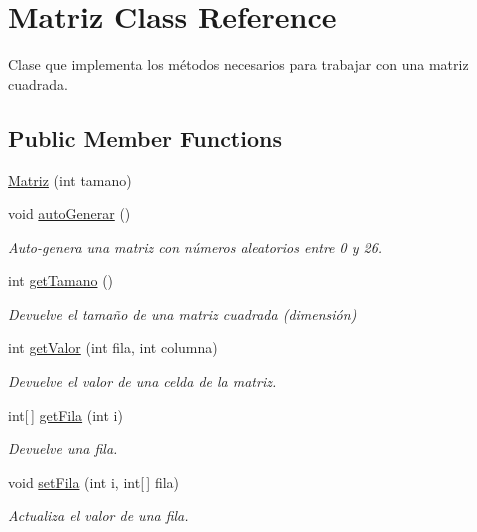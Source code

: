 \hypertarget{classMatriz}{\section{Matriz Class Reference}
\label{classMatriz}
}


Clase que implementa los métodos necesarios para trabajar con una matriz cuadrada.  


\subsection*{Public Member Functions}
\begin{DoxyCompactItemize}
\item 
\hyperlink{classMatriz_a5300a2e433d2a0ce0f7a18879591ba44}{Matriz} (int tamano)
\item 
void \hyperlink{classMatriz_a4951dffed918ec71ccfc4da71df8d155}{auto\-Generar} ()
\begin{DoxyCompactList}\small\item\em Auto-\/genera una matriz con números aleatorios entre 0 y 26. \end{DoxyCompactList}\item 
int \hyperlink{classMatriz_ac7480742c1df8a3b165e2bb55006310d}{get\-Tamano} ()
\begin{DoxyCompactList}\small\item\em Devuelve el tamaño de una matriz cuadrada (dimensión) \end{DoxyCompactList}\item 
int \hyperlink{classMatriz_aff57f6720c62264098b013f66960508f}{get\-Valor} (int fila, int columna)
\begin{DoxyCompactList}\small\item\em Devuelve el valor de una celda de la matriz. \end{DoxyCompactList}\item 
int\mbox{[}$\,$\mbox{]} \hyperlink{classMatriz_ac8e0eddd894e306a71a4911617f3c339}{get\-Fila} (int i)
\begin{DoxyCompactList}\small\item\em Devuelve una fila. \end{DoxyCompactList}\item 
void \hyperlink{classMatriz_add9623784073c059fe9a531e8423c90e}{set\-Fila} (int i, int\mbox{[}$\,$\mbox{]} fila)
\begin{DoxyCompactList}\small\item\em Actualiza el valor de una fila. \end{DoxyCompactList}\item 

\end{DoxyCompactItemize}
